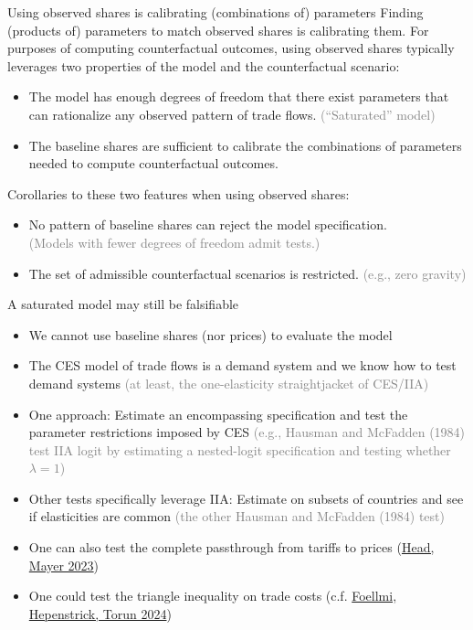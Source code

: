 \documentclass[11pt,notes=hide,aspectratio=169]{beamer}
\begin{document}
\begin{frame}{Using observed shares is calibrating (combinations of) parameters}
Finding (products of) parameters to match observed shares is calibrating them.
\medskip
For purposes of computing counterfactual outcomes, using observed shares typically leverages two properties of the model and the counterfactual scenario:
\begin{itemize}
\item
The model has enough degrees of freedom that there exist parameters that can rationalize any observed pattern of trade flows.
\textcolor{gray}{(``Saturated'' model)}
\item
The baseline shares are sufficient to calibrate the combinations of parameters needed to compute counterfactual outcomes.
\end{itemize}
\medskip
Corollaries to these two features when using observed shares:
\begin{itemize}
\item
No pattern of baseline shares can reject the model specification.\\
\textcolor{gray}{(Models with fewer degrees of freedom admit tests.)}
\item
The set of admissible counterfactual scenarios is restricted.
\textcolor{gray}{(e.g., zero gravity)}
\end{itemize}
\end{frame}
\begin{frame}{A saturated model may still be falsifiable}
\begin{itemize}
\item We cannot use baseline shares (nor prices) to evaluate the model
\item The CES model of trade flows is a demand system and we know how to test demand systems
\textcolor{gray}{(at least, the one-elasticity straightjacket of CES/IIA)}
\item One approach: Estimate an encompassing specification and test the parameter restrictions imposed by CES
\textcolor{gray}{(e.g., Hausman and McFadden (1984) test IIA logit by estimating a nested-logit specification and testing whether $\lambda = 1$)}
\item Other tests specifically leverage IIA:
Estimate on subsets of countries and see if elasticities are common
\textcolor{gray}{(the other Hausman and McFadden (1984) test)}
\item One can also test the complete passthrough from tariffs to prices (\href{https://direct.mit.edu/rest/article/doi/10.1162/rest_a_01369/117708/Poor-Substitutes-Counterfactual-Methods-in-IO-and}{Head, Mayer 2023})
\item One could test the triangle inequality on trade costs (c.f. \href{https://doi.org/10.1016/j.jinteco.2024.104018}{Foellmi, Hepenstrick, Torun 2024})
\end{itemize}
\end{frame}
\end{document}
